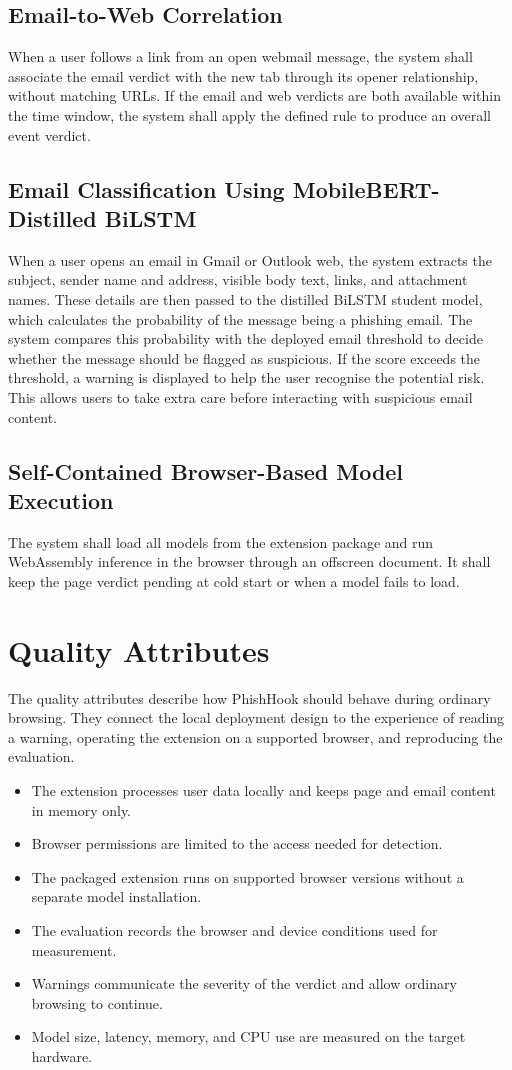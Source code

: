 \documentclass{FastFyp}
\begin{document}
\subsection{Email-to-Web Correlation}
When a user follows a link from an open webmail message, the system shall associate the email verdict with the new tab through its opener relationship, without matching URLs. If the email and web verdicts are both available within the time window, the system shall apply the defined rule to produce an overall event verdict.

\subsection{Email Classification Using MobileBERT-Distilled BiLSTM}
When a user opens an email in Gmail or Outlook web, the system extracts the subject, sender name and address, visible body text, links, and attachment names. These details are then passed to the distilled BiLSTM student model, which calculates the probability of the message being a phishing email. The system compares this probability with the deployed email threshold to decide whether the message should be flagged as suspicious. If the score exceeds the threshold, a warning is displayed to help the user recognise the potential risk. This allows users to take extra care before interacting with suspicious email content.

\subsection{Self-Contained Browser-Based Model Execution}
The system shall load all models from the extension package and run WebAssembly inference in the browser through an offscreen document. It shall keep the page verdict pending at cold start or when a model fails to load.

\section{Quality Attributes}
The quality attributes describe how PhishHook should behave during ordinary browsing. They connect the local deployment design to the experience of reading a warning, operating the extension on a supported browser, and reproducing the evaluation.
\begin{itemize}
    \item The extension processes user data locally and keeps page and email content in memory only.
    \item Browser permissions are limited to the access needed for detection.
    \item The packaged extension runs on supported browser versions without a separate model installation.
    \item The evaluation records the browser and device conditions used for measurement.
    \item Warnings communicate the severity of the verdict and allow ordinary browsing to continue.
    \item Model size, latency, memory, and CPU use are measured on the target hardware.
\end{itemize}
\end{document}
